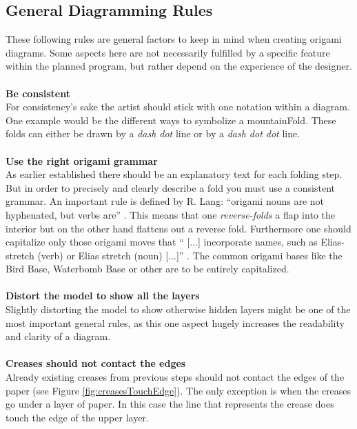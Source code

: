 \subsection{General Diagramming Rules}
\label{sec:generalRules}
These following rules are general factors to keep in mind when creating origami diagrams. Some aspects here are not necessarily fulfilled by a specific feature within the planned program, but rather depend on the experience of the designer.\\
\\
\textbf{Be consistent}\\
For consistency's sake the artist should stick with one notation within a diagram. One example would be the different ways to symbolize a \gls{mountainFold}. These folds can either be drawn by a \emph{dash dot} line or by a \emph{dash dot dot} line.\\
\\
\textbf{Use the right origami grammar}\\
As earlier established there should be an explanatory text for each folding step. But in order to precisely and clearly describe a fold you must use a consistent grammar. An important rule is defined by R. Lang: \enquote{origami nouns are not hyphenated, but verbs are} \cite{Lang}. This means that one \emph{reverse-folds} a flap into the interior but on the other hand flattens out a reverse fold.
Furthermore one should capitalize only those origami moves that \enquote{ [...] incorporate names, such as Elias-stretch (verb) or Elias stretch (noun) [...]} \cite{Lang}. The common origami bases like the Bird Base, Waterbomb Base or other are to be entirely capitalized.\\
\\
\textbf{Distort the model to show all the layers}\\
Slightly distorting the model to show otherwise hidden layers might be one of the most important general rules, as this one aspect hugely increases the readability and clarity of a diagram.\\
\\
\textbf{Creases should not contact the edges}\\
Already existing creases from previous steps should not contact the edges of the paper (see Figure \ref{fig:creasesTouchEdge}). The only exception is when the creases go under a layer of paper. In this case the line that represents the crease does touch the edge of the upper layer.\\
